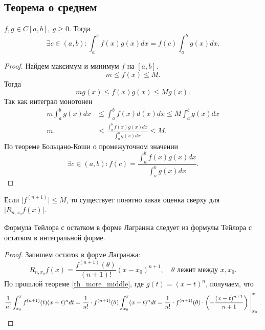 \subsection{Теорема о среднем}
\begin{thm}\label{th_more_middle}
    $ f, g \in  C[a, b], ~ g \ge 0$. Тогда 
    \[
	\exists c \in (a, b): \int_{a}^{b} f(x) g(x) dx = f(c) \int_{a}^{b} g(x) dx  
    .\] 
\end{thm}
\begin{proof}
    Найдем максимум и минимум $ f$ на $ [a, b]$. \[
	m \le f(x) \le M
    .\] 
    Тогда \[
	m g(x) \le f(x) g(x) \le M g(x)
    .\] 
    Так как интеграл монотонен
    \begin{align*}
	m \int_{a}^{b} g(x) dx & \le  \int_{a}^{b} f(x) d(x) dx \le M \int_{a}^{b} g(x) dx   
	\\
	m &\le  \frac{\int_{a}^{b} f(x)g(x)dx}{\int_{a}^{b} g(x)dx } \le M 
	.
    \end{align*}
    По теореме Больцано-Коши о промежуточном значении 
    \[
	\exists c \in (a, b): f(c) = \frac{\int_{a}^{b} f(x)g(x)dx}{\int_{a}^{b} g(x)dx } 
    .\] 
\end{proof}
\begin{cor}
    Если $ \lvert f^{(n+1)} \rvert \le M$, то существует понятно какая оценка сверху для $ \lvert R_{n, x_0} f(x) \rvert$.
\end{cor}
\begin{thm}
    Формула Тейлора с остатком в форме Лагранжа следует из формулы Тейлора с остатком в интегральной форме.
\end{thm}
\begin{proof}
    Запишем остаток в форме Лагранжа:
    \[
	R_{n, x_0} f(x) = \frac{f^{(n+1)}(\theta)}{(n+1)!} (x-x_0)^{n+1}, \quad \theta \text{ лежит между } x, x_0
    .\] 
    По прошлой теореме \ref{th_more_middle}, где $ g(t) = (x-t)^{n}$, получаем, что
    \[
	\frac{1}{n!} \int_{x_0}^{x} f^{(n+1)} (t)(x-t)^{n} dt = \frac{1}{n!} \cdot f^{(n+1)}(\theta) \int_{x_0}^{x} (x-t)^{n}dt = \frac{1}{n!} \cdot f^{(n+1)}(\theta) \cdot \left(-\frac{  (x-t)^{n+1}}{n+1} \right) \Biggm |_{x_0}^{x}
    .\] 
\end{proof}
